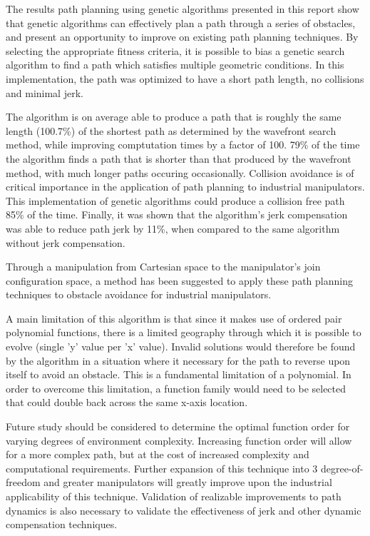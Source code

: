 The results path planning using genetic algorithms presented in this report show that genetic algorithms can effectively plan a path through a series of obstacles, and present an opportunity to improve on existing path planning techniques. By selecting the appropriate fitness criteria, it is possible to bias a genetic search algorithm to find a path which satisfies multiple geometric conditions. In this implementation, the path was optimized to have a short path length, no collisions and minimal jerk.

The algorithm is on average able to produce a path that is roughly the same length (100.7\%) of the shortest path as determined by the wavefront search method, while improving comptutation times by a factor of 100. 79\% of the time the algorithm finds a path that is shorter than that produced by the wavefront method, with much longer paths occuring occasionally. Collision avoidance is of critical importance in the application of path planning to industrial manipulators. This implementation of genetic algorithms could produce a collision free path 85\% of the time. Finally, it was shown that the algorithm's jerk compensation was able to reduce path jerk by 11\%, when compared to the same algorithm without jerk compensation.

Through a manipulation from Cartesian space to the manipulator's join configuration space, a method has been suggested to apply these path planning techniques to obstacle avoidance for industrial manipulators.

A main limitation of this algorithm is that since it makes use of ordered pair polynomial functions, there is a limited geography through which it is possible to evolve (single 'y' value per 'x' value). Invalid solutions would therefore be found by the algorithm in a situation where it necessary for the path to reverse upon itself to avoid an obstacle. This is a fundamental limitation of a polynomial. In order to overcome this limitation, a function family would need to be selected that could double back across the same x-axis location.

Future study should be considered to determine the optimal function order for varying degrees of environment complexity. Increasing function order will allow for a more complex path, but at the cost of increased complexity and computational requirements. Further expansion of this technique into 3 degree-of-freedom and greater manipulators will greatly improve upon the industrial applicability of this technique. Validation of realizable improvements to path dynamics is also necessary to validate the effectiveness of jerk and other dynamic compensation techniques.